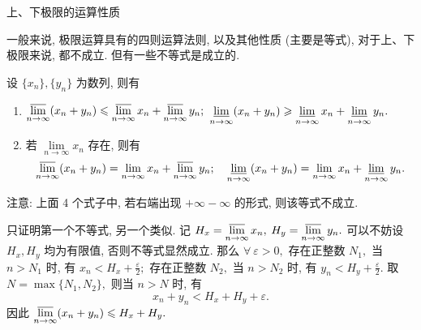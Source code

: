 \begin{frame}{上、下极限的运算性质}

一般来说, 极限运算具有的四则运算法则, 以及其他性质 (主要是等式), 对于上、下极限来说, \alert{都不成立. 但有一些不等式是成立的}.

\pause

\begin{thm}[加法运算性质]
设 $\{x_n\}, \{y_n\}$ 为数列, 则有
\begin{enumerate}
\item $\varlimsup\limits_{n\to\infty} (x_n + y_n) \leqslant \varlimsup\limits_{n\to\infty} x_n + \varlimsup\limits_{n\to\infty} y_n;$ $\varliminf\limits_{n\to\infty} (x_n + y_n) \geqslant \varliminf\limits_{n\to\infty} x_n + \varliminf\limits_{n\to\infty} y_n.$
\item 若 $\lim\limits_{n\to\infty} x_n$ 存在, 则有
\[
\varlimsup\limits_{n\to\infty} (x_n + y_n) = \lim\limits_{n\to\infty} x_n + \varlimsup\limits_{n\to\infty} y_n; \quad
\varliminf\limits_{n\to\infty} (x_n + y_n) = \lim\limits_{n\to\infty} x_n + \varliminf\limits_{n\to\infty} y_n.
\]
\end{enumerate}
\alert{注意:} 上面 4 个式子中, 若右端出现 $+\infty - \infty$ 的形式, 则该等式不成立.
\end{thm}

\pause

只证明第一个不等式, 另一个类似. 记 $H_x = \varlimsup\limits_{n\to\infty} x_n,$ $H_y = \varlimsup\limits_{n\to\infty} y_n.$ 可以不妨设 $H_x, H_y$ 均为有限值, 否则不等式显然成立. 那么 $\forall~\varepsilon > 0,$ 存在正整数 $N_1,$ 当 $n > N_1$ 时, 有 $x_n < H_x + \frac{\varepsilon}{2};$ 存在正整数 $N_2,$ 当 $n > N_2$ 时, 有 $y_n < H_y + \frac{\varepsilon}{2}.$ 取 $N = \max\{N_1, N_2\},$ 则当 $n > N$ 时, 有
\[
x_n + y_n < H_x + H_y + \varepsilon.
\]
因此 $\varlimsup\limits_{n\to\infty} (x_n + y_n) \leqslant H_x + H_y.$

\end{frame}


